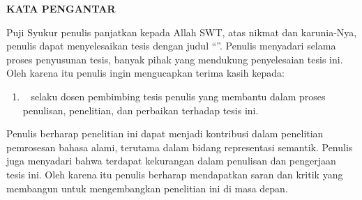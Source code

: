 \clearpage

\begin{center}
  \textbf{\large KATA PENGANTAR}\\[3em]
\end{center}

Puji Syukur penulis panjatkan kepada Allah SWT, atas nikmat dan karunia-Nya, penulis dapat menyelesaikan tesis dengan judul ``\textit{\Title}''. Penulis menyadari selama proses penyusunan tesis, banyak pihak yang mendukung penyelesaian tesis ini. Oleh karena itu penulis ingin mengucapkan terima kasih kepada:
\begin{enumerate}
  \item \SupervisorHonorific~\SupervisorName{} selaku dosen pembimbing tesis penulis yang membantu dalam proses penulisan, penelitian, dan perbaikan terhadap tesis ini.
\end{enumerate}

Penulis berharap penelitian ini dapat menjadi kontribusi dalam penelitian pemrosesan bahasa alami, terutama dalam bidang representasi semantik. Penulis juga menyadari bahwa terdapat kekurangan dalam penulisan dan pengerjaan tesis ini. Oleh karena itu penulis berharap mendapatkan saran dan kritik yang membangun untuk mengembangkan penelitian ini di masa depan.
